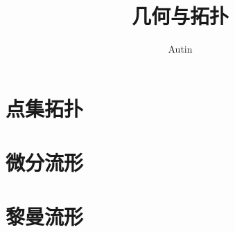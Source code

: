\documentclass[lang=cn,12pt,color=blue,pad,fontset=none]{elegantbook}
\title{几何与拓扑}
\author{Autin}
\begin{document}
\maketitle

\frontmatter

\tableofcontents

\mainmatter

\part{点集拓扑}



\part{微分流形}















\part{黎曼流形}




















                                    

\end{document}

